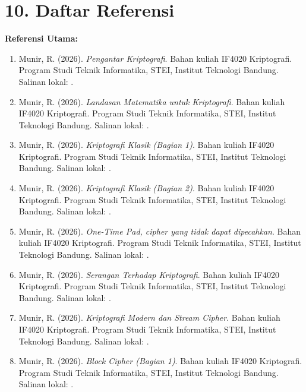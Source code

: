 \documentclass[12pt,a4paper]{article}
\begin{document}
\vspace{0.5cm}

\section*{10. Daftar Referensi}

\textbf{Referensi Utama:}
\begin{sloppypar}
\begin{enumerate}[leftmargin=*]
  \item Munir, R. (2026). \textit{Pengantar Kriptografi}. Bahan kuliah IF4020 Kriptografi. Program Studi Teknik Informatika, STEI, Institut Teknologi Bandung. Salinan lokal: .
  \item Munir, R. (2026). \textit{Landasan Matematika untuk Kriptografi}. Bahan kuliah IF4020 Kriptografi. Program Studi Teknik Informatika, STEI, Institut Teknologi Bandung. Salinan lokal: .
  \item Munir, R. (2026). \textit{Kriptografi Klasik (Bagian 1)}. Bahan kuliah IF4020 Kriptografi. Program Studi Teknik Informatika, STEI, Institut Teknologi Bandung. Salinan lokal: .
  \item Munir, R. (2026). \textit{Kriptografi Klasik (Bagian 2)}. Bahan kuliah IF4020 Kriptografi. Program Studi Teknik Informatika, STEI, Institut Teknologi Bandung. Salinan lokal: .
  \item Munir, R. (2026). \textit{One-Time Pad, cipher yang tidak dapat dipecahkan}. Bahan kuliah IF4020 Kriptografi. Program Studi Teknik Informatika, STEI, Institut Teknologi Bandung. Salinan lokal: .
  \item Munir, R. (2026). \textit{Serangan Terhadap Kriptografi}. Bahan kuliah IF4020 Kriptografi. Program Studi Teknik Informatika, STEI, Institut Teknologi Bandung. Salinan lokal: .
  \item Munir, R. (2026). \textit{Kriptografi Modern dan Stream Cipher}. Bahan kuliah IF4020 Kriptografi. Program Studi Teknik Informatika, STEI, Institut Teknologi Bandung. Salinan lokal: .
  \item Munir, R. (2026). \textit{Block Cipher (Bagian 1)}. Bahan kuliah IF4020 Kriptografi. Program Studi Teknik Informatika, STEI, Institut Teknologi Bandung. Salinan lokal: .

\end{enumerate}
\end{sloppypar}
\end{document}
